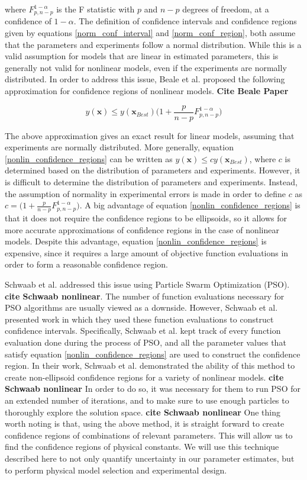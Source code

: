 where $F_{p,n-p}^{1-\alpha}$ is the F statistic with $p$ and $n-p$ degrees of freedom, at a confidence of $1-\alpha$. The definition of confidence intervals and confidence regions given by equations \ref{norm_conf_interval} and \ref{norm_conf_region}, both assume that the parameters and experiments follow a normal distribution. While this is a valid assumption for models that are linear in estimated parameters, this is generally not valid for nonlinear models, even if the experiments are normally distributed. In order to address this issue, Beale et al. proposed the following approximation for confidence regions of nonlinear models. \textbf{Cite Beale Paper}

\begin{equation} \label{nonlin_confidence_regions}
    y(\mathbf{x}) \leq y(\mathbf{x}_{Best})\bigg(1 + \frac{p}{n-p}F_{p,n-p}^{1-\alpha}\bigg)
\end{equation}

The above approximation gives an exact result for linear models, assuming that experiments are normally distributed. More generally, equation \ref{nonlin_confidence_regions} can be written as $ y(\mathbf{x}) \leq cy(\mathbf{x}_{Best})$, where $c$ is determined based on the distribution of parameters and experiments. However, it is difficult to determine the distribution of parameters and experiments. Instead, the assumption of normality in experimental errors is made in order to define $c$ as $c=\bigg(1 + \frac{p}{n-p}F_{p,n-p}^{1-\alpha}\bigg)$. A big advantage of equation \ref{nonlin_confidence_regions} is that it does not require the confidence regions to be ellipsoids, so it allows for more accurate approximations of confidence regions in the case of nonlinear models. Despite this advantage, equation \ref{nonlin_confidence_regions} is expensive, since it requires a large amount of objective function evaluations in order to form a reasonable confidence region. 

Schwaab et al. addressed this issue using Particle Swarm Optimization (PSO). \textbf{cite Schwaab nonlinear}. The number of function evaluations necessary for PSO algorithms are usually viewed as a downside. However, Schwaab et al. presented work in which they used these function evaluations to construct confidence intervals. Specifically, Schwaab et al. kept track of every function evaluation done during the process of PSO, and all the parameter values that satisfy equation \ref{nonlin_confidence_regions} are used to construct the confidence region. In their work, Schwaab et al. demonstrated the ability of this method  to create non-ellipsoid confidence regions for a variety of nonlinear models. \textbf{cite Schwaab nonlinear} In order to do so, it was necessary for them to run PSO for an extended number of iterations, and to make sure to use enough particles to thoroughly explore the solution space. \textbf{cite Schwaab nonlinear} One thing worth noting is that, using the above method, it is straight forward to create confidence regions of combinations of relevant parameters. This will allow us to find the confidence regions of physical constants. We will use this technique described here to not only quantify uncertainty in our parameter estimates, but to perform physical model selection and experimental design. 

